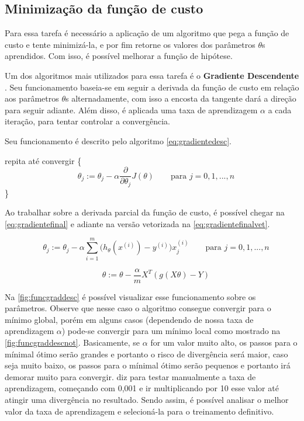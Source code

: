 \subsection{Minimização da função de custo}

Para essa tarefa é necessário a aplicação de um algoritmo que pega a função de custo e tente minimizá-la, e por fim retorne os valores dos parâmetros $ \theta $s aprendidos. Com isso, é possível melhorar a função de hipótese. 

Um dos algoritmos mais utilizados para essa tarefa é o \textbf{Gradiente Descendente} \cite{michalski2013machine}. Seu funcionamento baseia-se em seguir a derivada da função de custo em relação aos parâmetros $\theta$s alternadamente, com isso a encosta da tangente dará a direção para seguir adiante. Além disso, é aplicada uma taxa de aprendizagem $ \alpha $ a cada iteração, para tentar controlar a convergência.

Seu funcionamento é descrito pelo algoritmo \ref{eq:gradientedesc}.

repita até convergir \{
\begin{equation}
\label{eq:gradientedesc}
\quad \theta_j := \theta_j - \alpha \frac{\partial}{\partial\theta_j} J(\theta)   \quad\quad \text{para } j=0,1,...,n
\end{equation}
\quad\quad\quad \}

Ao trabalhar sobre a derivada parcial da função de custo, é possível chegar na \autoref{eq:gradientefinal} e adiante na versão vetorizada na \autoref{eq:gradientefinalvet}. 

\begin{equation}
\quad \theta_j := \theta_j - \alpha \sum\limits_{i=1}^{m}\Big(h_{\theta}(x^{(i)}) - y^{(i)} \Big) x_j^{(i)}   \quad\quad \text{para } j=0,1,...,n \label{eq:gradientefinal} 
\end{equation}

\begin{equation}
\quad \theta := \theta - \frac{\alpha}{m}X^T(g(X\theta) - Y) \label{eq:gradientefinalvet}
\end{equation}

Na \autoref{fig:funcgraddesc} é possível visualizar esse funcionamento sobre os parâmetros. Observe que nesse caso o algoritmo consegue convergir para o mínimo global, porém em alguns casos (dependendo de nossa taxa de aprendizagem $ \alpha $) pode-se convergir para um mínimo local como mostrado na \autoref{fig:funcgraddescnot}. Basicamente, se $\alpha$ for um valor muito alto, os passos para o mínimal ótimo serão grandes e portanto o risco de divergência será maior, caso seja muito baixo, os passos para o mínimal ótimo serão pequenos e portanto irá demorar muito para convergir.  diz para testar manualmente a taxa de aprendizagem, começando com 0,001 e ir multiplicando por 10 esse valor até atingir uma divergência no resultado. Sendo assim, é possível analisar o melhor valor da taxa de aprendizagem e selecioná-la para o treinamento definitivo. 

